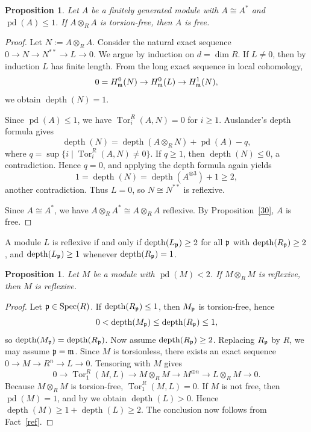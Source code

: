 \documentclass[11.05pt,a4paper]{amsart}
\newtheorem{proposition}[theorem]{Proposition}
\theoremstyle{definition}
\theoremstyle{remark}
\newcommand{\Spec}{\operatorname{Spec}}
\newcommand{\pd}{\operatorname{pd}}
\newcommand{\Tor}{\operatorname{Tor}}
\newcommand{\depth}{\operatorname{depth}}
\newcommand{\fm}{\frak{m}}
\newcommand{\fp}{\frak{p}}
\begin{document}
\begin{proposition}
	Let \( A \) be a finitely generated module with \( A \cong A^* \) and \( \pd(A) \le 1 \). If \( A \otimes_R A \) is torsion-free, then \( A \) is free.
\end{proposition}

\begin{proof}
	Let \( N := A \otimes_R A \). Consider the natural exact sequence
	\(
	0 \to N \to N^{**} \to L \to 0.
	\)
	We argue by induction on \( d = \dim R \). If \( L \ne 0 \), then by induction \( L \) has finite length. From the long exact sequence in local cohomology,
	\[
	0 = H^0_{\fm}(N) \to H^0_{\fm}(L) \to H^1_{\fm}(N),
	\]
	we obtain \( \depth(N) = 1 \).
	
	Since \( \pd(A) \le 1 \), we have \( \Tor_i^R(A,N) = 0 \) for \( i \ge 1 \). Auslander's depth formula gives
	\[
	\depth(N) = \depth(A \otimes_R N) + \pd(A) - q,
	\]
	where \( q = \sup\{ i \mid \Tor_i^R(A,N) \ne 0 \} \). If \( q \ge 1 \), then \( \depth(N) \le 0 \), a contradiction. Hence \( q=0 \), and applying the depth formula again yields
	\[
	1 = \depth(N) = \depth(A^{\otimes 3}) + 1 \ge 2,
	\]
	another contradiction. Thus \( L=0 \), so \( N \cong N^{**} \) is reflexive.
	
	Since \( A \cong A^* \), we have \( A \otimes_R A^* \cong A \otimes_R A \) reflexive. By Proposition~\ref{30}, \( A \) is free.
\end{proof}

\begin{fact}\label{ref}
	A module \( L \) is reflexive if and only if \( \depth(L_{\fp}) \ge 2 \) for all \( \fp \) with \( \depth(R_{\fp}) \ge 2 \), and \( \depth(L_{\fp}) \ge 1 \) whenever \( \depth(R_{\fp}) = 1 \).
\end{fact}

\begin{proposition}
	Let \( M \) be a module with \( \pd(M) < 2 \). If \( M \otimes_R M \) is reflexive, then \( M \) is reflexive.
\end{proposition}

\begin{proof}
	Let \( \fp \in \Spec(R) \). If \( \depth(R_{\fp}) \le 1 \), then \( M_{\fp} \) is torsion-free, hence
	\[
	0 < \depth(M_{\fp}) \le \depth(R_{\fp}) \le 1,
	\]
	so \( \depth(M_{\fp}) = \depth(R_{\fp}) \). Now assume \( \depth(R_{\fp}) \ge 2 \). Replacing \( R_{\fp} \) by \( R \), we may assume \( \fp = \fm \). Since \( M \) is torsionless, there exists an exact sequence
	\(
	0 \to M \to R^n \to L \to 0.
	\)
	Tensoring with \( M \) gives
	\[
	0 \to \Tor_1^R(M,L) \to M \otimes_R M \to M^{\oplus n} \to L \otimes_R M \to 0.
	\]
	Because \( M \otimes_R M \) is torsion-free, \( \Tor_1^R(M,L)=0 \). If \( M \) is not free, then \( \pd(M)=1 \), and by \cite{au} we obtain \( \depth(L) > 0 \). Hence \( \depth(M) \ge 1 + \depth(L) \ge 2 \). The conclusion now follows from Fact~\ref{ref}.
\end{proof}
\end{document}
